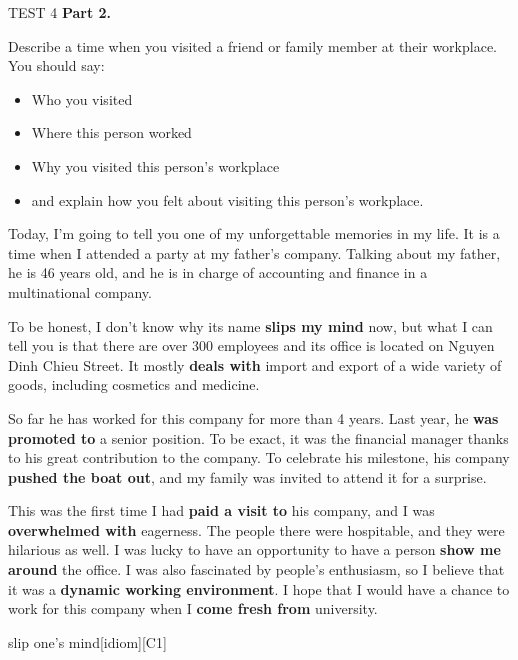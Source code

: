 \begin{glossarymc}[Cambridge 12]
\begin{test}{TEST 4}
    \noindent
    \textbf{Part 2.}
    \begin{qa}{Describe a time when you visited a friend or family member at their workplace. You should say:}
    \begin{itemize}
        \item Who you visited
        \item Where this person worked
        \item Why you visited this person’s workplace
        \item and explain how you felt about visiting this person’s workplace.
    \end{itemize}

    Today, I’m going to tell you one of my unforgettable memories in my life. It is a time when I attended a party at my father’s company. Talking about my father, he is 46 years old, and he is in charge of accounting and finance in a multinational company.  

    To be honest, I don’t know why its name \textbf{slips my mind} now, but what I can tell you is that there are over 300 employees and its office is located on Nguyen Dinh Chieu Street. It mostly \textbf{deals with} import and export of a wide variety of goods, including cosmetics and medicine.  

    So far he has worked for this company for more than 4 years. Last year, he \textbf{was promoted to} a senior position. To be exact, it was the financial manager thanks to his great contribution to the company. To celebrate his milestone, his company \textbf{pushed the boat out}, and my family was invited to attend it for a surprise.  

    This was the first time I had \textbf{paid a visit to} his company, and I was \textbf{overwhelmed with} eagerness. The people there were hospitable, and they were hilarious as well. I was lucky to have an opportunity to have a person \textbf{show me around} the office. I was also fascinated by people’s enthusiasm, so I believe that it was a \textbf{dynamic working environment}. I hope that I would have a chance to work for this company when I \textbf{come fresh from} university.
    \end{qa}

        \begin{VocabExplain}[Part 2]
            \begin{ExplainCard}{slip one’s mind}[idiom][C1]
            \end{ExplainCard}


\end{VocabExplain}
\end{test}
\end{glossarymc}
